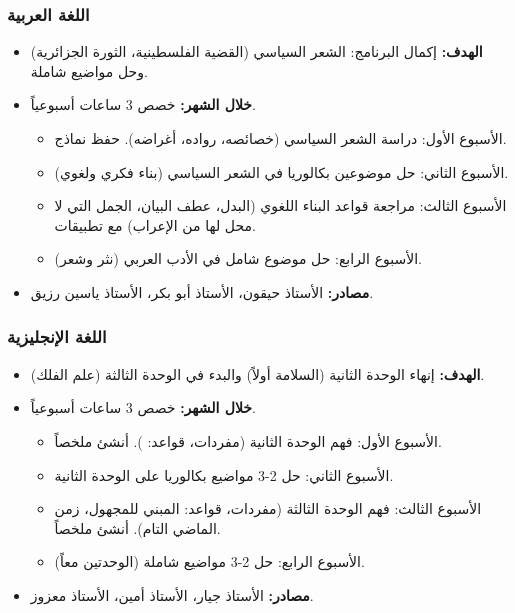 \documentclass[12pt,a4paper]{book}
\begin{document}
	\subsubsection*{اللغة العربية}
	\begin{itemize}
		\item \textbf{الهدف:} إكمال البرنامج: الشعر السياسي (القضية الفلسطينية، الثورة الجزائرية) وحل مواضيع شاملة.
		\item \textbf{خلال الشهر:} خصص 3 ساعات أسبوعياً.
		\begin{itemize}
			\item الأسبوع الأول: دراسة الشعر السياسي (خصائصه، رواده، أغراضه). حفظ نماذج.
			\item الأسبوع الثاني: حل موضوعين بكالوريا في الشعر السياسي (بناء فكري ولغوي).
			\item الأسبوع الثالث: مراجعة قواعد البناء اللغوي (البدل، عطف البيان، الجمل التي لا محل لها من الإعراب) مع تطبيقات.
			\item الأسبوع الرابع: حل موضوع شامل في الأدب العربي (نثر وشعر).
		\end{itemize}
		\item \textbf{مصادر:} الأستاذ حيقون، الأستاذ أبو بكر، الأستاذ ياسين رزيق.
	\end{itemize}
	
	\subsubsection*{اللغة الإنجليزية}
	\begin{itemize}
		\item \textbf{الهدف:} إنهاء الوحدة الثانية (السلامة أولاً) والبدء في الوحدة الثالثة (علم الفلك).
		\item \textbf{خلال الشهر:} خصص 3 ساعات أسبوعياً.
		\begin{itemize}
			\item الأسبوع الأول: فهم الوحدة الثانية (مفردات، قواعد: ). أنشئ ملخصاً.
			\item الأسبوع الثاني: حل 2-3 مواضيع بكالوريا على الوحدة الثانية.
			\item الأسبوع الثالث: فهم الوحدة الثالثة (مفردات، قواعد: المبني  \newline للمجهول، زمن الماضي التام). أنشئ ملخصاً.
			\item الأسبوع الرابع: حل 2-3 مواضيع شاملة (الوحدتين معاً).
		\end{itemize}
		\item \textbf{مصادر:} الأستاذ جيار، الأستاذ أمين، الأستاذ معزوز.
	\end{itemize}
	
\end{document}
